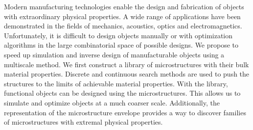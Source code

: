 % 
% 
%
Modern manufacturing technologies enable the design and fabrication of objects with extraordinary physical properties. A wide range of applications have been demonstrated in the fields of mechanics, acoustics, optics and electromagnetics.
Unfortunately, it is difficult to design objects manually or with optimization algorithms in the large combinatorial space of possible designs.
We propose to speed up simulation and inverse design of manufacturable objects using a multiscale method.
We first construct a library of microstructures with their bulk material properties.
Discrete and continuous search methods are used to push the structures to the limits of achievable material properties.
With the library, functional objects can be designed using the microstructures.
This allows us to simulate and optimize objects at a much coarser scale.
Additionally, the representation of the microstructure envelope provides a way to discover families of microstructures with extremal physical properties.